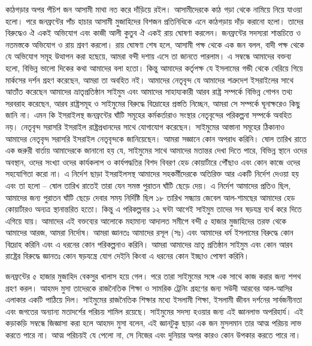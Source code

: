 \documentclass[
]{book}
\begin{document}
কাঠগড়ার অপর পঁচিশ জন আসামী মাথা নত করে দাঁড়িয়ে রইল। আসামীদেরকে কাঠ গড়া থেকে নামিয়ে নিয়ে যাওয়া হলো। পরে জনফ্রন্টের পাঁচ হাচার আসামী মুজাহিদের বিশজন প্রতিনিধিকে এনে কাঠগড়ায় দাঁড় করানো হলো। তাদের বিরুদ্ধেও ঐ একই অভিযোগ এবং কাজী আলী কুতুব ঐ একই রায় ঘোষণা করলেন। জনফ্রন্টের সদস্যরা শান্তচিত্তে ও নতমস্তকে অভিযোগ ও রায় শ্রবণ করলো। রায় ঘোষণা শেষ হলে, আসামী পক্ষ থেকে এক জন বলল, বাদী পক্ষ থেকে যে অভিযোগ সমূহ উত্থাপন করা হছেয়ে, আমরা বন্দী দশায় এসে তা জানতে পারলাম। এ সম্বন্ধে আমাদের বক্তব্য হলো, বিভিন্ন ভালো দিকের কথা আমাদের বলা হতো। কিন্তু আমাদের কর্তৃপক্ষ যে ইসলামের গন্ডী থেকে বেরিয়ে গিয়ে মার্কসের দর্শন গ্রহণ করেছেন, আমরা তা অবহিত নই। আমাদের নেতৃবৃন্দ যে আমাদের শত্রুদেশ ইসরাইলের সাথে আতাঁত করেছেন আমাদের ভ্রাতৃপ্রতিষ্ঠান সাইমুম এবং আমাদের সাহায্যকারী আরব রাষ্ট্র সম্পর্কে বিভিন্ন গোপন তথ্য সরবরাহ করেছেন, আরব রাষ্ট্রসমূহ ও সাইমুমের বিরুদ্ধে বিদ্রোহের প্রস্ততি নিচ্ছেন, আমরা সে সম্পর্কে ঘূনাক্ষরেও কিছু জানি না। এমন কি ইসরাইলস্থ জনফ্রন্টের ঘাঁটি সমূহের কর্মকর্তারাও সংস্থার নেতৃবৃন্দের পরিকল্পনা সম্পর্কে অবহিত নয়। নেতৃবৃন্দ সরাসরি ইসরাইল রাষ্ট্রপ্রধানদের সাথে যোগাযোগ করেছেন। সাইমুমের আস্তানা সমূহের ঠিকানাও আমাদের নেতৃবৃন্দ সরাসরি ইসরাইল নেতৃবৃন্দকে জানিয়েছেন। আমরা সজ্ঞানে কোন অপরাধ করিনি। ষোল তারিখ রাতে এক জরুরী বার্তায় আমাদেরকে জানানো হয় যে, সাইমুমের সাথে আমাদের মতান্তর দেখা দিতে পারে, বিভিন্ন স্থানে ওদের অবস্থান, ওদের সংখ্যা ওদের কার্যকলাপ ও কার্যপদ্ধতির বিশদ বিবরণ হেড কোয়ার্টারে পৌঁছাও এবং কোন কাজে ওদের সহযোগিতা করো না। এ নির্দেশ ছাড়া ইসরাইলসস্থ আমাদের সহকর্মীদেরকে অতিরিক্ত আর একটি নির্দেশ দেওয়া হয় এবং তা হলো -- ষোল তারিখ রাতেই তারা যেন সমস্ত পুরাতন ঘাঁটি ছেড়ে দেয়। এ নির্দেশ আমাদের প্রতিও ছিল, আমাদের জন্য পুরাতন ঘাঁটি ছেড়ে দেবার সময় নির্দিষ্টি ছিল ১৮ তারিখ সন্ধ্যায় জেবেল আল-শামছের আমাদের হেড কোয়ার্টারও অন্যত্র স্থানান্তরিত হতো। কিন্তু এ পরিকল্পনার ১২ ঘন্টা আগেই সাইমুম তাদের সব ষড়যন্ত্র ব্যর্থ করে দিতে এগিয়ে যায়। আমাদের এই বক্তব্যের আলোকে মহামান্য আদালত সমীপে বন্দী ৫ হাজার মুজাহিদের তরফ থেকে আমাদের আরজ, আমরা নির্দোষ। আমরা জ্ঞানতঃ আমাদের রসূল (সঃ) এবং আমাদের ধর্ম ইসলামের বিরুদ্ধে কোন বিদ্রোহ করিনি এবং এ ধরনের কোন পরিকল্পনাও করিনি। আমরা আমাদের ভ্রাতৃ প্রতিষ্ঠান সাইমুম এবং কোন আরব রাষ্ট্রের বিরুদ্ধে জ্ঞানতঃ কোন ষড়যন্ত্রে যোগ দেইনি কিংবা এ ধরনের কোন ইচ্ছাও পোষণ করিনি।

জনফ্রন্টের ৫ হাজার মুজাহিদ বেকসুর খালাস হয়ে গেল। পরে তারা সাইমুমের সঙ্গে এক সাথে কাজ করার জন্য শপথ গ্রহণ করল। আহমদ মুসা তাদেরকে রাজনৈতিক শিক্ষা ও সামরিক ট্রেনিং গ্রহণের জন্য সউদী আরবের আল-আসির এলাকার একটি পাঠিয়ে দিল। সাইমুমের রাজনৈতিক শিক্ষার মধ্যে ইসলামী শিক্ষা, ইসলামী জীবন দর্শনের সার্বজনীনতা এবং জগতের অন্যান্য মতাদর্শের পরিচয় শামিল রয়েছে। সাইমুমের সদস্য হওয়ার জন্য এই জ্ঞানলাভ অপরিহার্য। এই কড়াকড়ি সম্বন্ধে জিজ্ঞাসা করা হলে আহমদ মুসা বলেন, এই জ্ঞানটুকু ছাড়া এক জন মুসলমান তার আত্ম পরিচয় লাভ করতে পারে না। আত্ম পরিচয়ই যে পেলো না, সে নিজের এবং দুনিয়ার অপর কারও কোন উপকার করতে পারে না।
\end{document}
